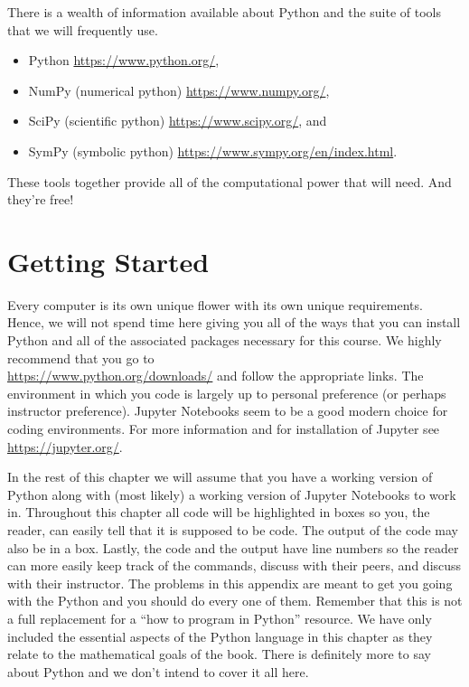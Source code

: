 There is a wealth of information available about Python and the suite of tools that we will frequently use.
\begin{itemize}
    \item Python \href{https://www.python.org/}{https://www.python.org/},
    \item NumPy (numerical python) \href{https://www.numpy.org/}{https://www.numpy.org/},
    \item SciPy (scientific python) \href{https://www.scipy.org/}{https://www.scipy.org/}, and
    \item SymPy (symbolic python)
        \href{https://www.sympy.org/en/index.html}{https://www.sympy.org/en/index.html}.
\end{itemize}
These tools together provide all of the computational power that will need.  And they're free!

\section{Getting Started}
Every computer is its own unique flower with its own unique requirements.  Hence, we will
not spend time here giving you all of the ways that you can install Python and all of the
associated packages necessary for this course.  We highly recommend that you go to \\
\href{https://www.python.org/downloads/}{https://www.python.org/downloads/} and follow the
appropriate links.  The environment in which you code is largely up to personal preference
(or perhaps instructor preference).  Jupyter Notebooks seem to be a good modern choice for
coding environments.  For more information and for installation of Jupyter see
\href{https://jupyter.org/}{https://jupyter.org/}.

In the rest of this chapter we will assume that you have a working version of Python along
with (most likely) a working version of Jupyter Notebooks to work in.  Throughout this
chapter all code will be highlighted in boxes so you, the reader, can easily tell that it
is supposed to be code.  The output of the code may also be in a box.  Lastly, the code
and the output have line numbers so the reader can more easily keep track of the commands,
discuss with their peers, and discuss with their instructor.  The problems in this
appendix are
meant to get you going with the Python and you should do every one of them.  Remember that
this is not a full replacement for a ``how to program in Python'' resource.  We have only
included the essential aspects of the Python language in this chapter as they relate to
the mathematical goals of the book.  There is definitely more to say about Python and we
don't intend to cover it all here.


